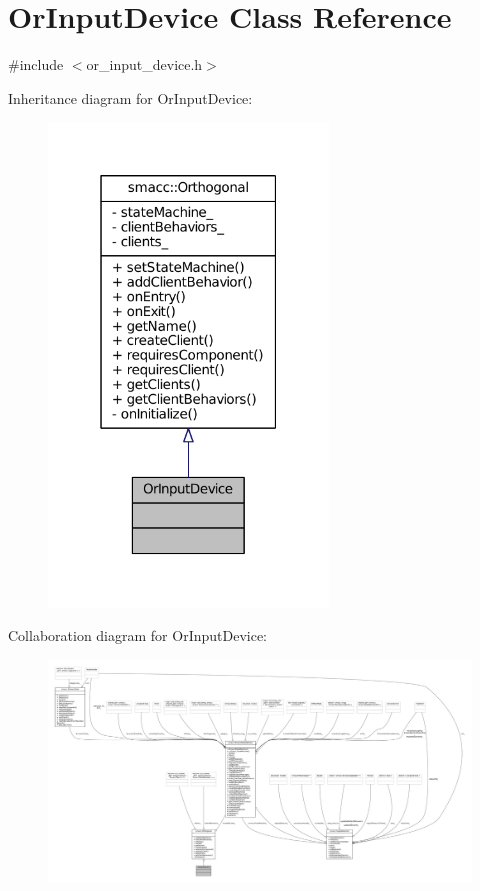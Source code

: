 \hypertarget{classOrInputDevice}{}\section{Or\+Input\+Device Class Reference}
\label{classOrInputDevice}


{\ttfamily \#include $<$or\+\_\+input\+\_\+device.\+h$>$}



Inheritance diagram for Or\+Input\+Device\+:
\nopagebreak
\begin{figure}[H]
\begin{center}
\leavevmode
\includegraphics[width=211pt]{classOrInputDevice__inherit__graph}
\end{center}
\end{figure}


Collaboration diagram for Or\+Input\+Device\+:
\nopagebreak
\begin{figure}[H]
\begin{center}
\leavevmode
\includegraphics[width=350pt]{classOrInputDevice__coll__graph}
\end{center}
\end{figure}
